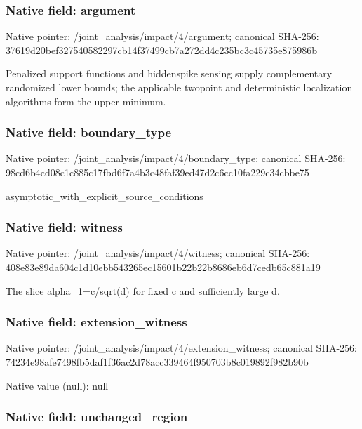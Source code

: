 \documentclass[10pt,a4paper]{article}
\begin{document}
\subsubsection{Native field: argument}


Native pointer: /joint\_analysis/impact/4/argument; canonical SHA-256: 37619d20bef327540582297c\allowbreak{}b14f37499cb7a272dd4c235b\allowbreak{}c3c45735e875986b


Penalized support functions and hiddenspike sensing supply complementary randomized lower bounds; the applicable twopoint and deterministic localization algorithms form the upper minimum.


\subsubsection{Native field: boundary\_type}


Native pointer: /joint\_analysis/impact/4/boundary\_type; canonical SHA-256: 98cd6b4cd08c1c885c17fbd6\allowbreak{}f7a4b3c48faf39ed47d2c6cc\allowbreak{}10fa229c34cbbe75


asymptotic\_with\_explicit\allowbreak{}\_source\_conditions


\subsubsection{Native field: witness}


Native pointer: /joint\_analysis/impact/4/witness; canonical SHA-256: 408e83e89da604c1d10ebb54\allowbreak{}3265ec15601b22b22b8686eb\allowbreak{}6d7cedb65c881a19


The slice alpha\_1=c/sqrt(d) for fixed c and sufficiently large d.


\subsubsection{Native field: extension\_witness}


Native pointer: /joint\_analysis/impact/4\allowbreak{}/extension\_witness; canonical SHA-256: 74234e98afe7498fb5daf1f3\allowbreak{}6ac2d78acc339464f950703b\allowbreak{}8c019892f982b90b



Native value (null): null



\subsubsection{Native field: unchanged\_region}
\end{document}
